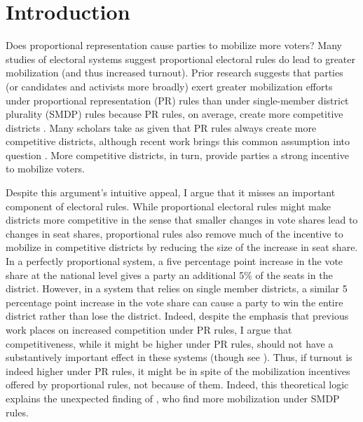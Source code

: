 \documentclass[12pt]{article}
\begin{document}

\newpage
\doublespace

\section*{Introduction}

Does proportional representation cause parties to mobilize more voters? Many studies of electoral systems suggest proportional electoral rules do lead to greater mobilization (and thus increased turnout). Prior research suggests that parties (or candidates and activists more broadly) exert greater mobilization efforts under proportional representation (PR) rules than under single-member district plurality (SMDP) rules because PR rules, on average, create more competitive districts \citep{Cox1999}. Many scholars take as given that PR rules always create more competitive districts, although recent work brings this common assumption into question \citep{BlaisLago2009}. More competitive districts, in turn, provide parties a strong incentive to mobilize voters. 

Despite this argument's intuitive appeal, I argue that it misses an important component of electoral rules. While proportional electoral rules might make districts more competitive in the sense that smaller changes in vote shares lead to changes in seat shares, proportional rules also remove much of the incentive to mobilize in competitive districts by reducing the size of the increase in seat share. In a perfectly proportional system, a five percentage point increase in the vote share at the national level gives a party an additional 5\% of the seats in the district. However, in a system that relies on single member districts, a similar 5 percentage point increase in the vote share can cause a party to win the entire district rather than lose the district. Indeed, despite the emphasis that previous work places on increased competition under PR rules, I argue that competitiveness, while it might be higher  under PR rules, should not have a substantively important effect in these systems (though see \citealt{BlaisLago2009}). Thus, if turnout is indeed higher under PR rules, it might be in spite of the mobilization incentives offered by proportional rules, not because of them. Indeed, this theoretical logic explains the unexpected finding of \cite{KarpBanducciBowler2007}, who find more mobilization under SMDP rules. 
\end{document}
